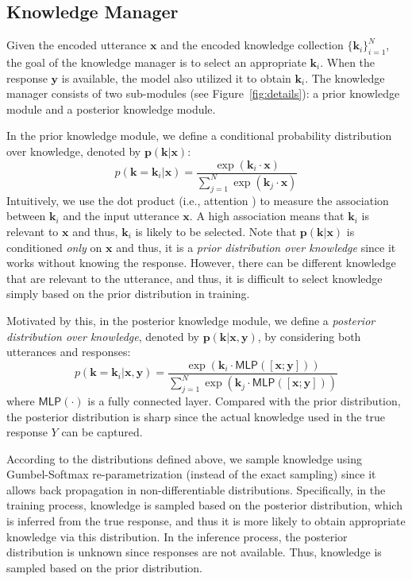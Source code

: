 \documentclass{article}
\begin{document}
\subsection{Knowledge Manager}
\label{subsec:knowledge}
Given the encoded utterance $\mathbf{x}$ and the encoded knowledge collection $\{\mathbf{k}_i\}_{i=1}^N$,
the goal of the knowledge manager is to select an appropriate $\mathbf{k}_i$.
When the response $\mathbf{y}$ is available,
the model also utilized it to obtain $\mathbf{k}_i$. 
The knowledge manager consists of two sub-modules (see Figure~\ref{fig:details}): a prior knowledge module and a posterior knowledge module.

In the prior knowledge module,
we define a conditional probability distribution over knowledge,
denoted by $\mathbf{p}(\mathbf{k}|\mathbf{x})$:
$$p(\mathbf{k} = \mathbf{k}_i|\mathbf{x}) = \frac{\exp(\mathbf{k}_i \cdot \mathbf{x})}{\sum_{j=1}^N \exp(\mathbf{k}_j \cdot \mathbf{x})}$$
Intuitively, 
we use the dot product (i.e., attention \cite{bahdanau2014neural}) to measure the association between $\mathbf{k}_i$ and the input utterance $\mathbf{x}$.
A high association means that $\mathbf{k}_i$ is relevant to $\mathbf{x}$ and thus,
$\mathbf{k}_i$ is likely to be selected.
Note that $\mathbf{p}(\mathbf{k}|\mathbf{x})$ is conditioned \emph{only} on $\mathbf{x}$ and thus, 
it is a \emph{prior distribution over knowledge} since it works without knowing the response.
However,
there can be different knowledge that are relevant to the utterance,
and thus, it is difficult to select knowledge simply based on the prior distribution in training.

Motivated by this, in the posterior knowledge module, 
we define a \emph{posterior distribution over knowledge}, denoted by $\mathbf{p}(\mathbf{k}|\mathbf{x}, \mathbf{y})$, by considering both utterances and responses:
$$p(\mathbf{k} = \mathbf{k}_i|\mathbf{x}, \mathbf{y}) = \frac{ \exp(\mathbf{k}_i \cdot \mathsf{MLP}([\mathbf{x}; \mathbf{y}]))}{\sum_{j=1}^N \exp(\mathbf{k}_j \cdot \mathsf{MLP}([\mathbf{x}; \mathbf{y}]))}$$
where $\mathsf{MLP}(\cdot)$ is a fully connected layer.
Compared with the prior distribution, 
the posterior distribution is sharp
since the actual knowledge used in the true response $Y$ can be captured. 

According to the distributions defined above,
we sample knowledge 
using Gumbel-Softmax re-parametrization \cite{jang2016categorical}
(instead of the exact sampling)
since it allows back propagation in non-differentiable distributions.
Specifically, 
in the training process,
knowledge is sampled based on the posterior distribution,
which is inferred from the true response, and thus
it is more likely to obtain appropriate knowledge via this distribution.
In the inference process,
the posterior distribution is unknown since responses are not available.
Thus, knowledge is sampled based on the prior distribution.
\end{document}
